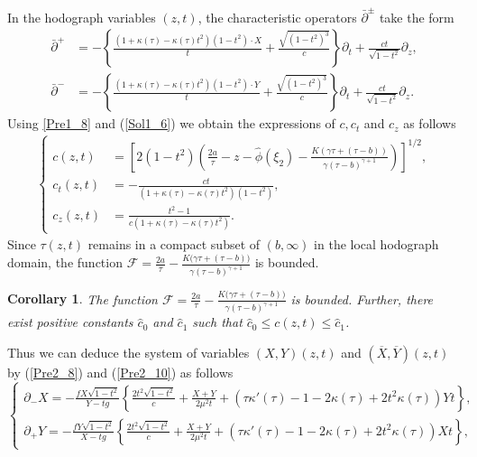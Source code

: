 \documentclass[3p,11pt]{elsarticle}
\numberwithin{equation}{section}
\newtheorem{corollary}{Corollary}[section]
\begin{document}
In the hodograph variables $(z,t)$, the characteristic operators $\bar\partial^\pm$ take the form
\begin{equation}\label{Sol1_6}
\begin{split}
    \bar{\partial}^+ &= -\left\{ \frac{{(1+\kappa(\tau)-\kappa(\tau) t^2)(1-t^2)}\cdot {X}}{t} 
+ \frac{\sqrt{(1-t^2)^3}}{c}\right\} \partial_t + \frac{ct}{\sqrt{1-t^2}} \partial_z,\\
\bar{\partial}^- &= -\left\{ \frac{{(1+\kappa(\tau)-\kappa(\tau) t^2)(1-t^2)}\cdot { Y}}{t} 
+ \frac{\sqrt{(1-t^2)^3}}{c} 
\right\} \partial_t + \frac{ct}{\sqrt{1-t^2}} \partial_z.
\end{split}
\end{equation}
Using \eqref{Pre1_8} and (\ref{Sol1_6}) we obtain the expressions of $c, c_t$ and $c_z$ as follows
\begin{equation}\label{Sol1_7}
    \begin{split}
        \begin{cases}
             c(z,t) &= \left[2(1-t^2)\left(\frac{2a}{\tau}-z-\hat\phi(\xi_2)-\frac{K(\gamma\tau+(\tau-b))}{\gamma(\tau-b)^{\gamma+1}} \right) \right]^{1/2},\\
             c_t(z,t) &=-\frac{ct}{(1+\kappa(\tau)-\kappa(\tau) t^2)(1-t^2)},\\ 
             c_z(z,t) &=\frac{t^2-1}{c(1+\kappa(\tau)-\kappa(\tau) t^2)}.
        \end{cases}
    \end{split}
\end{equation}
Since $\tau(z,t)$ remains in a compact subset of $(b,\infty)$ in the local hodograph domain, the function $\mathcal{F}=\frac{2a}{\tau}
-\frac{K\big(\gamma\tau+(\tau-b)\big)}{\gamma(\tau-b)^{\gamma+1}}$ is bounded.
\begin{corollary}\label{cbound}
   The function $\mathcal{F}=\frac{2a}{\tau}
-\frac{K\big(\gamma\tau+(\tau-b)\big)}{\gamma(\tau-b)^{\gamma+1}}$ is bounded. Further, there exist positive constants $\hat{c}_0$ and $\hat{c}_1$ such that $\hat{c}_0\le c(z,t)\le \hat{c}_1$.
\end{corollary}
Thus we can deduce the system of variables $({X},{Y})(z,t)$ and $(\overline{X}, \overline{Y})(z,t)$ by (\ref{Pre2_8}) and (\ref{Pre2_10}) as follows
\begin{equation}\label{Sol1_8}
\begin{cases}
\partial_- {X} = -\frac{fX \sqrt{1-t^2}}{ Y-tg} \left\{\frac{2t^2\sqrt{1-t^2}}{c}+\frac{X+ Y}{2\mu^2t}+\left(\tau\kappa'(\tau)-1-2\kappa(\tau)+2t^2\kappa(\tau) \right)  Y t\right\},\\
\partial_+ {Y} =-\frac{f Y \sqrt{1-t^2}}{X-tg} \left\{\frac{2t^2\sqrt{1-t^2}}{c}+\frac{X+ Y}{2\mu^2t}+\left(\tau\kappa'(\tau)-1-2\kappa(\tau)+2t^2\kappa(\tau) \right) X t\right\},
\end{cases}
\end{equation}
\end{document}
